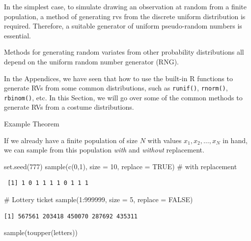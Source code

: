 \documentclass[
  letterpaper,
  DIV=11,
  numbers=noendperiod]{scrreprt}
\newenvironment{Shaded}{\begin{snugshade}}{\end{snugshade}}
\newcommand{\AttributeTok}[1]{\textcolor[rgb]{0.40,0.45,0.13}{#1}}
\newcommand{\CommentTok}[1]{\textcolor[rgb]{0.37,0.37,0.37}{#1}}
\newcommand{\ConstantTok}[1]{\textcolor[rgb]{0.56,0.35,0.01}{#1}}
\newcommand{\DecValTok}[1]{\textcolor[rgb]{0.68,0.00,0.00}{#1}}
\newcommand{\FunctionTok}[1]{\textcolor[rgb]{0.28,0.35,0.67}{#1}}
\newcommand{\NormalTok}[1]{\textcolor[rgb]{0.00,0.23,0.31}{#1}}
\newcommand{\SpecialCharTok}[1]{\textcolor[rgb]{0.37,0.37,0.37}{#1}}
\begin{document}
In the simplest case, to simulate drawing an observation at random from
a finite population, a method of generating rvs from the discrete
uniform distribution is required. Therefore, a suitable generator of
uniform pseudo-random numbers is essential.

Methods for generating random variates from other probability
distributions all depend on the uniform random number generator (RNG).

In the Appendices, we have seen that how to use the built-in R functions
to generate RVs from some common distributions, such as
\texttt{runif()}, \texttt{rnorm()}, \texttt{rbinom()}, etc. In this
Section, we will go over some of the common methods to generate RVs from
a costume distributions.

Example Theorem

If we already have a finite population of size \(N\) with values
\(x_1, x_2, \ldots, x_N\) in hand, we can sample from this population
\emph{with} and \emph{without} replacement.

\begin{Shaded}
\begin{Highlighting}[]
\FunctionTok{set.seed}\NormalTok{(}\DecValTok{777}\NormalTok{)}
\FunctionTok{sample}\NormalTok{(}\FunctionTok{c}\NormalTok{(}\DecValTok{0}\NormalTok{,}\DecValTok{1}\NormalTok{), }\AttributeTok{size =} \DecValTok{10}\NormalTok{, }\AttributeTok{replace =} \ConstantTok{TRUE}\NormalTok{)  }\CommentTok{\# with replacement}
\end{Highlighting}
\end{Shaded}

\begin{verbatim}
 [1] 1 0 1 1 1 1 0 1 1 1
\end{verbatim}

\begin{Shaded}
\begin{Highlighting}[]
\CommentTok{\# Lottery ticket}
\FunctionTok{sample}\NormalTok{(}\DecValTok{1}\SpecialCharTok{:}\DecValTok{999999}\NormalTok{, }\AttributeTok{size =} \DecValTok{5}\NormalTok{, }\AttributeTok{replace =} \ConstantTok{FALSE}\NormalTok{)}
\end{Highlighting}
\end{Shaded}

\begin{verbatim}
[1] 567561 203418 450070 287692 435311
\end{verbatim}

\begin{Shaded}
\begin{Highlighting}[]
\FunctionTok{sample}\NormalTok{(}\FunctionTok{toupper}\NormalTok{(letters))}
\end{Highlighting}
\end{Shaded}
\end{document}
